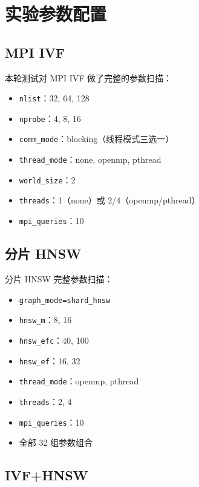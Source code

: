 \documentclass[a4paper]{article}
\begin{document}
\section{实验参数配置}

\subsection{MPI IVF}

本轮测试对 MPI IVF 做了完整的参数扫描：
\begin{itemize}
    \item \texttt{nlist}：32, 64, 128
    \item \texttt{nprobe}：4, 8, 16
    \item \texttt{comm\_mode}：blocking（线程模式三选一）
    \item \texttt{thread\_mode}：none, openmp, pthread
    \item \texttt{world\_size}：2
    \item \texttt{threads}：1（none）或 2/4（openmp/pthread）
    \item \texttt{mpi\_queries}：10
\end{itemize}

\subsection{分片 HNSW}

分片 HNSW 完整参数扫描：
\begin{itemize}
    \item \texttt{graph\_mode=shard\_hnsw}
    \item \texttt{hnsw\_m}：8, 16
    \item \texttt{hnsw\_efc}：40, 100
    \item \texttt{hnsw\_ef}：16, 32
    \item \texttt{thread\_mode}：openmp, pthread
    \item \texttt{threads}：2, 4
    \item \texttt{mpi\_queries}：10
    \item 全部 32 组参数组合
\end{itemize}

\subsection{IVF+HNSW}
\end{document}
